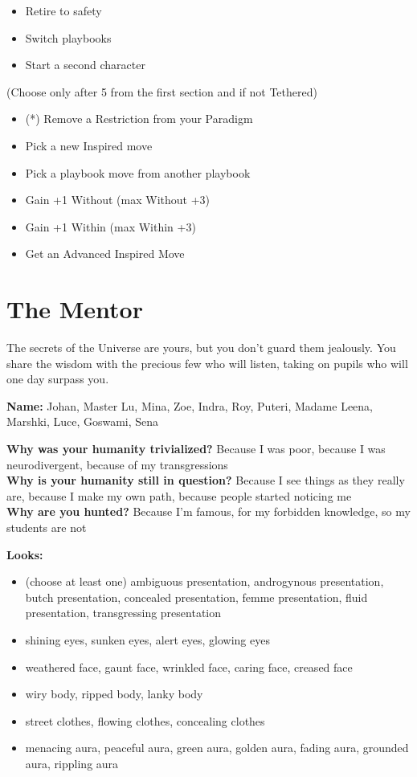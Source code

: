 \documentclass[
  oneside,
  statementpaper,
  9pt]{memoir}
\begin{document}
\begin{itemize}
\tightlist
\item
  Retire to safety
\item
  Switch playbooks
\item
  Start a second character
\end{itemize}

(Choose only after 5 from the first section and if not Tethered)

\begin{itemize}
\tightlist
\item
  (*) Remove a Restriction from your Paradigm
\item
  Pick a new Inspired move
\item
  Pick a playbook move from another playbook
\item
  Gain +1 Without (max Without +3)
\item
  Gain +1 Within (max Within +3)
\item
  Get an Advanced Inspired Move
\end{itemize}

\newpage

\hypertarget{the-mentor}{%
\section{The Mentor}\label{the-mentor}}

The secrets of the Universe are yours, but you don't guard them
jealously. You share the wisdom with the precious few who will listen,
taking on pupils who will one day surpass you.

\textbf{Name:} Johan, Master Lu, Mina, Zoe, Indra, Roy, Puteri, Madame
Leena, Marshki, Luce, Goswami, Sena

\textbf{Why was your humanity trivialized?} Because I was poor, because
I was neurodivergent, because of my transgressions\\
\textbf{Why is your humanity still in question?} Because I see things as
they really are, because I make my own path, because people started
noticing me\\
\textbf{Why are you hunted?} Because I'm famous, for my forbidden
knowledge, so my students are not

\textbf{Looks:}

\begin{itemize}
\tightlist
\item
  (choose at least one) ambiguous presentation, androgynous
  presentation, butch presentation, concealed presentation, femme
  presentation, fluid presentation, transgressing presentation
\item
  shining eyes, sunken eyes, alert eyes, glowing eyes
\item
  weathered face, gaunt face, wrinkled face, caring face, creased face
\item
  wiry body, ripped body, lanky body
\item
  street clothes, flowing clothes, concealing clothes
\item
  menacing aura, peaceful aura, green aura, golden aura, fading aura,
  grounded aura, rippling aura
\end{itemize}
\end{document}
